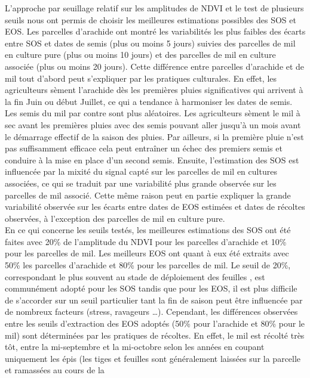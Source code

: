 L’approche par seuillage relatif sur les amplitudes de NDVI et le test de plusieurs seuils nous ont permis de choisir les meilleures estimations possibles des SOS et EOS. Les parcelles d’arachide ont montré les variabilités les plus faibles des écarts entre
SOS et dates de semis (plus ou moins 5 jours) suivies des parcelles de mil en culture pure (plus ou moins 10 jours) et des parcelles de mil en culture associée (plus ou moins 20 jours). Cette différence entre parcelles d’arachide et de mil tout d’abord peut s’expliquer par les pratiques culturales. En effet, les agriculteurs sèment l’arachide dès les premières pluies significatives qui arrivent à la fin Juin ou début Juillet, ce qui a tendance à harmoniser les dates de semis. Les semis du mil par contre sont plus aléatoires. Les agriculteurs sèment le mil à sec avant les premières pluies avec des semis pouvant aller jusqu’à un mois avant le démarrage effectif de la saison des pluies. Par ailleurs, si la première pluie n’est pas suffisamment efficace cela peut entraîner un échec des premiers semis et conduire à la mise en place d’un second semis. Ensuite, l’estimation des SOS est influencée par la mixité du signal capté sur les parcelles de mil en cultures associées, ce qui se traduit par une variabilité plus grande
observée sur les parcelles de mil associé. Cette même raison peut en partie expliquer la grande variabilité observée sur les écarts entre dates de EOS estimées et dates de récoltes observées, à l’exception des parcelles de mil en culture pure.
\\En ce qui concerne les seuils testés, les meilleures estimations des SOS ont été faites avec 20\% de l’amplitude du NDVI pour les parcelles d’arachide et 10\% pour les parcelles de mil. Les meilleurs EOS ont quant à eux été extraits avec 50\% les parcelles d’arachide et 80\% pour les parcelles de mil. Le seuil de 20\%, correspondant le plus
souvent au stade de déploiement des feuilles \citep{Misra2016}, est communément adopté pour les SOS \citep{Brandt2016} tandis que pour les EOS, il est plus difficile de s’accorder sur un seuil particulier tant la fin de saison peut être influencée par de nombreux facteurs (stress, ravageurs \ldots). Cependant, les différences observées entre les seuils d’extraction des EOS adoptés (50\% pour l’arachide et 80\% pour le mil) sont déterminées par les pratiques de récoltes. En effet, le mil est récolté très tôt, entre la mi-septembre et la mi-octobre selon les années en coupant uniquement les épis (les tiges et feuilles sont généralement laissées sur la parcelle et ramassées au cours de la
